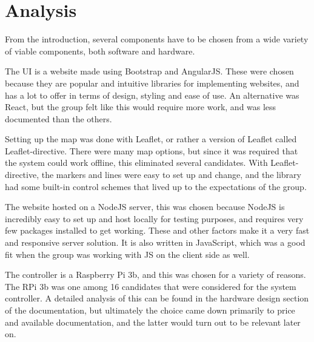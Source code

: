 \newpage
\chapter{Analysis}

From the introduction, several components have to be chosen from a wide variety of viable components, both software and hardware.

The UI is a website made using Bootstrap and AngularJS. These were chosen because they are popular and intuitive libraries for implementing websites, and has a lot to offer in terms of design, styling and ease of use. An alternative was React, but the group felt like this would require more work, and was less documented than the others. 

Setting up the map was done with Leaflet, or rather a version of Leaflet called Leaflet-directive. There were many map options, but since it was required that the system could work offline, this eliminated several candidates. With Leaflet-directive, the markers and lines were easy to set up and change, and the library had some built-in control schemes that lived up to the expectations of the group.

The website hosted on a NodeJS server, this was chosen because NodeJS is incredibly easy to set up and host locally for testing purposes, and requires very few packages installed to get working. These and other factors make it a very fast and responsive server solution. It is also written in JavaScript, which was a good fit when the group was working with JS on the client side as well.

The controller is a Raspberry Pi 3b, and this was chosen for a variety of reasons. The RPi 3b was one among 16 candidates that were considered for the system controller. A detailed analysis of this can be found in the hardware design section of the documentation, but ultimately the choice came down primarily to price and available documentation, and the latter would turn out to be relevant later on.

